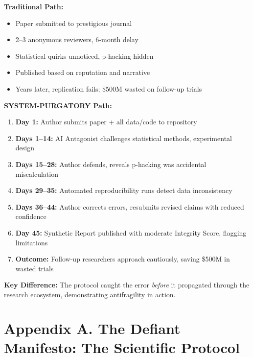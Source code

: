 \documentclass[11pt,a4paper]{article}
\begin{document}
\textbf{Traditional Path:}
\begin{itemize}[nosep]
    \item Paper submitted to prestigious journal
    \item 2--3 anonymous reviewers, 6-month delay
    \item Statistical quirks unnoticed, p-hacking hidden
    \item Published based on reputation and narrative
    \item Years later, replication fails; \$500M wasted on follow-up trials
\end{itemize}

\textbf{SYSTEM-PURGATORY Path:}
\begin{enumerate}[nosep]
    \item \textbf{Day 1:} Author submits paper + all data/code to repository
    \item \textbf{Days 1--14:} AI Antagonist challenges statistical methods, experimental design
    \item \textbf{Days 15--28:} Author defends, reveals p-hacking was accidental miscalculation
    \item \textbf{Days 29--35:} Automated reproducibility runs detect data inconsistency
    \item \textbf{Days 36--44:} Author corrects errors, resubmits revised claims with reduced confidence
    \item \textbf{Day 45:} Synthetic Report published with moderate Integrity Score, flagging limitations
    \item \textbf{Outcome:} Follow-up researchers approach cautiously, saving \$500M in wasted trials
\end{enumerate}

\textbf{Key Difference:} The protocol caught the error \textit{before} it propagated through the research ecosystem, demonstrating antifragility in action.


\clearpage %



\section*{Appendix A. The Defiant Manifesto: The Scientific Protocol}
\label{app:manifesto}
\end{document}
